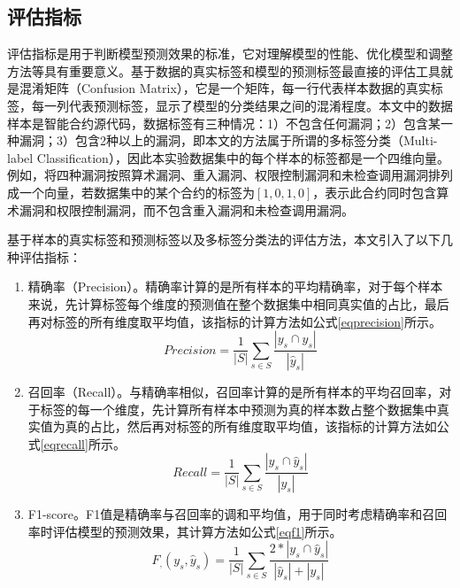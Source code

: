 \subsection{评估指标}
\label{sec:评估指标}
评估指标是用于判断模型预测效果的标准，它对理解模型的性能、优化模型和调整方法等具有重要意义。基于数据的真实标签和模型的预测标签最直接的评估工具就是混淆矩阵（Confusion Matrix），它是一个矩阵，每一行代表样本数据的真实标签，每一列代表预测标签，显示了模型的分类结果之间的混淆程度。本文中的数据样本是智能合约源代码，数据标签有三种情况：1）不包含任何漏洞；2）包含某一种漏洞；3）包含2种以上的漏洞，即本文的方法属于所谓的多标签分类（Multi-label Classification），因此本实验数据集中的每个样本的标签都是一个四维向量。例如，将四种漏洞按照算术漏洞、重入漏洞、权限控制漏洞和未检查调用漏洞排列成一个向量，若数据集中的某个合约的标签为$[ 1, 0, 1, 0 ]$，表示此合约同时包含算术漏洞和权限控制漏洞，而不包含重入漏洞和未检查调用漏洞。

基于样本的真实标签和预测标签以及多标签分类法的评估方法，本文引入了以下几种评估指标：
\begin{enumerate}[label=(\arabic*)]
    \item 精确率（Precision）。精确率计算的是所有样本的平均精确率，对于每个样本来说，先计算标签每个维度的预测值在整个数据集中相同真实值的占比，最后再对标签的所有维度取平均值，该指标的计算方法如公式\eqref{eqprecision}所示。
\begin{equation}
    Precision=\frac1{|S|}\sum_{s\in S}\frac{|y_s\cap\hat{y}_s|}{|\hat{y}_s|} \label{eqprecision}
\end{equation}
    \item 召回率（Recall）。与精确率相似，召回率计算的是所有样本的平均召回率，对于标签的每一个维度，先计算所有样本中预测为真的样本数占整个数据集中真实值为真的占比，然后再对标签的所有维度取平均值，该指标的计算方法如公式\eqref{eqrecall}所示。
\begin{equation}
    Recall=\frac{1}{|S|}\sum_{s\in S}\frac{|y_s\cap\hat{y}_s|}{|y_s|} \label{eqrecall}
\end{equation}
    \item F1-score。F1值是精确率与召回率的调和平均值，用于同时考虑精确率和召回率时评估模型的预测效果，其计算方法如公式\eqref{eqf1}所示。
\begin{equation}
    F_\text{,}(y_s,\hat{y}_s)=\frac{1}{|S|}\sum_{s\in S}\frac{2*|y_s\cap\hat{y}_s|}{|\hat{y}_s|+|y_s|} \label{eqf1}
\end{equation}
\end{enumerate}

